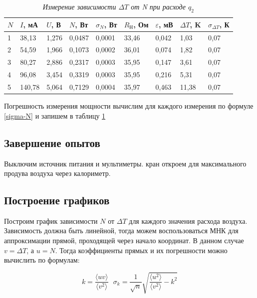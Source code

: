 \documentclass[a4paper,12pt]{article}
\begin{document}
\begin{table}[!ht]
    \centering
    \begin{tabular}{|l|l|l|l|l|l|l|l|l|}
    \hline
        $N$ & $I$, мА & $U$, В & $N$, Вт & $\sigma_N$, Вт & $R_\text{Н}$, Ом & $\varepsilon$, мВ & $\Delta T$, K & $\sigma_{\Delta T}$, К \\ \hline
        1 & 38,13 & 1,276 & 0,0487 & 0,0001 & 33,46 & 0,042 & 1,03 & 0,07 \\ \hline
        2 & 54,59 & 1,966 & 0,1073 & 0,0002 & 36,01 & 0,074 & 1,82 & 0,07 \\ \hline
        3 & 80,27 & 2,886 & 0,2317 & 0,0003 & 35,95 & 0,147 & 3,61 & 0,07 \\ \hline
        4 & 96,08 & 3,454 & 0,3319 & 0,0003 & 35,95 & 0,216 & 5,31 & 0,07 \\ \hline
        5 & 140,78 & 5,064 & 0,7129 & 0,0004 & 35,97 & 0,463 & 11,38 & 0,07 \\ \hline
    \end{tabular}\caption{\textit{Измерение зависимости $\Delta T$ от N при расходе $q_2$}}\label{deltaT-N-2}
\end{table}

Погрешность измерения мощности вычислим для каждого измерения по формуле \eqref{sigma-N} и запишем в таблицу \ref{deltaT-N-2}

\subsection{Завершение опытов}

Выключим источник питания и мультиметры. кран откроем для максимального продува воздуха через калориметр.

\subsection{Построение графиков}

Построим график зависимости $N$ от $\Delta T$ для каждого значения расхода воздуха. Зависимость должна быть линейной, тогда можем воспользоваться МНК для аппроксимации прямой, проходящей через начало координат. В данном случае $v = \Delta T$, а $u = N$. Тогда коэффициенты прямых и их погрешности можно вычислить по формулам:

\begin{equation}
    k = \frac{\langle u v \rangle}{\langle v^2 \rangle} \ \ \ \sigma_k = \frac{1}{\sqrt{n}} \sqrt{\frac{\langle u^2 \rangle}{\langle v^2 \rangle} - k^2}
\end{equation}
\end{document}

